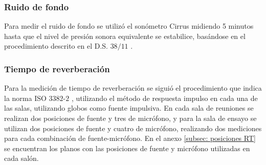 \begin{table}[H]
    \centering
    \caption{Instrumentación utilizada para las mediciones}
    \label{tab:instrumentacion}
\end{table}

\subsubsection{Ruido de fondo}
\noindent Para medir el ruido de fondo se utilizó el sonómetro Cirrus midiendo 5 minutos hasta que el nivel de presión sonora equivalente se estabilice, basándose en el procedimiento descrito en el D.S. $38/11$ \cite{ds:ds38}.

\subsubsection{Tiempo de reverberación}
\noindent Para la medición de tiempo de reverberación se siguió el procedimiento que indica la norma ISO $3382$-$2$ \cite{ISO3382-2}, utilizando el método de respuesta impulso en cada una de las salas, utilizando globos como fuente impulsiva.
En cada sala de reuniones se realizan dos posiciones de fuente y tres de micrófono, y para la sala de ensayo se utilizan dos posiciones de fuente y cuatro de micrófono, realizando dos mediciones para cada combinación de fuente-micrófono. En el anexo \ref{subsec: posiciones RT} se encuentran los planos con las posiciones de fuente y micrófono utilizadas en cada salón.





